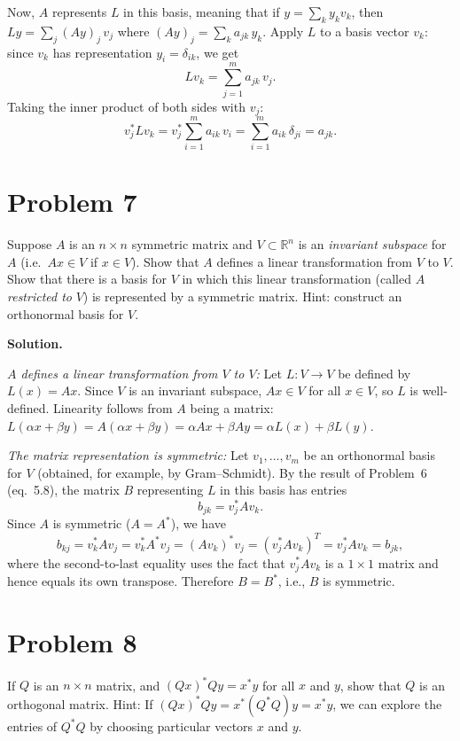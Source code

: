 \documentclass[letterpaper, 11pt]{article}
\newcommand{\R}{\mathbb{R}}   %
\newcommand{\1}{\mathds{1}}	%
\theoremstyle{definition}
\begin{document}
Now, $A$ represents $L$ in this basis, meaning that if $y = \sum_k y_k v_k$, then $Ly = \sum_j (Ay)_j\, v_j$ where $(Ay)_j = \sum_k a_{jk}\, y_k$. Apply $L$ to a basis vector $v_k$: since $v_k$ has representation $y_i = \delta_{ik}$, we get
\[
L v_k = \sum_{j=1}^m a_{jk}\, v_j.
\]
Taking the inner product of both sides with $v_j$:
\[
v_j^* L v_k = v_j^* \sum_{i=1}^m a_{ik}\, v_i = \sum_{i=1}^m a_{ik}\, \delta_{ji} = a_{jk}.
\]
\section*{Problem 7}

Suppose $A$ is an $n \times n$ symmetric matrix and $V \subset \R^n$ is an \textit{invariant subspace} for $A$ (i.e.\ $Ax \in V$ if $x \in V$). Show that $A$ defines a linear transformation from $V$ to $V$. Show that there is a basis for $V$ in which this linear transformation (called $A$ \textit{restricted to} $V$) is represented by a symmetric matrix. Hint: construct an orthonormal basis for $V$.

\medskip

\textbf{Solution.}

\textit{$A$ defines a linear transformation from $V$ to $V$:} Let $L: V \to V$ be defined by $L(x) = Ax$. Since $V$ is an invariant subspace, $Ax \in V$ for all $x \in V$, so $L$ is well-defined. Linearity follows from $A$ being a matrix: $L(\alpha x + \beta y) = A(\alpha x + \beta y) = \alpha Ax + \beta Ay = \alpha L(x) + \beta L(y)$.

\textit{The matrix representation is symmetric:} Let $v_1, \ldots, v_m$ be an orthonormal basis for $V$ (obtained, for example, by Gram--Schmidt). By the result of Problem~6 (eq.\ 5.8), the matrix $B$ representing $L$ in this basis has entries
\[
b_{jk} = v_j^* A v_k.
\]
Since $A$ is symmetric ($A = A^*$), we have
\[
b_{kj} = v_k^* A v_j = v_k^* A^* v_j = (A v_k)^* v_j = (v_j^* A v_k)^T = v_j^* A v_k = b_{jk},
\]
where the second-to-last equality uses the fact that $v_j^* A v_k$ is a $1 \times 1$ matrix and hence equals its own transpose. Therefore $B = B^*$, i.e., $B$ is symmetric.
\section*{Problem 8}

If $Q$ is an $n \times n$ matrix, and $(Qx)^*Qy = x^*y$ for all $x$ and $y$, show that $Q$ is an orthogonal matrix. Hint: If $(Qx)^*Qy = x^*(Q^*Q)y = x^*y$, we can explore the entries of $Q^*Q$ by choosing particular vectors $x$ and $y$.
\end{document}
